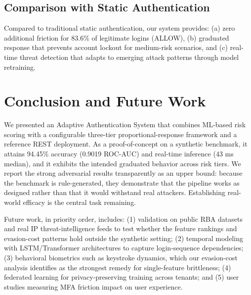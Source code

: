 \documentclass[conference]{IEEEtran}
\begin{document}
\subsection{Comparison with Static Authentication}
Compared to traditional static authentication, our system provides: (a) zero additional friction for 83.6\% of legitimate logins (ALLOW), (b) graduated response that prevents account lockout for medium-risk scenarios, and (c) real-time threat detection that adapts to emerging attack patterns through model retraining.

\section{Conclusion and Future Work}
We presented an Adaptive Authentication System that combines ML-based risk scoring with a configurable three-tier proportional-response framework and a reference REST deployment. As a proof-of-concept on a synthetic benchmark, it attains 94.45\% accuracy (0.9019 ROC-AUC) and real-time inference (43 ms median), and it exhibits the intended graduated behavior across risk tiers. We report the strong adversarial results transparently as an upper bound: because the benchmark is rule-generated, they demonstrate that the pipeline works as designed rather than that it would withstand real attackers. Establishing real-world efficacy is the central task remaining.

Future work, in priority order, includes: (1) validation on public RBA datasets and real IP threat-intelligence feeds to test whether the feature rankings and evasion-cost patterns hold outside the synthetic setting; (2) temporal modeling with LSTM/Transformer architectures to capture login-sequence dependencies; (3) behavioral biometrics such as keystroke dynamics, which our evasion-cost analysis identifies as the strongest remedy for single-feature brittleness; (4) federated learning for privacy-preserving training across tenants; and (5) user studies measuring MFA friction impact on user experience.
\end{document}
